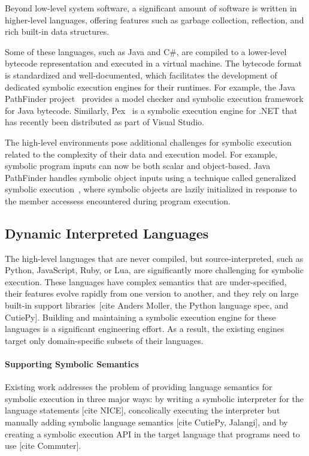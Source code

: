 Beyond low-level system software, a significant amount of software is written in higher-level languages, offering features such as garbage collection, reflection, and rich built-in data structures.

Some of these languages, such as Java and C\#, are compiled to a lower-level bytecode representation and executed in a virtual machine.
%
The bytecode format is standardized and well-documented, which facilitates the development of dedicated symbolic execution engines for their runtimes.
%
For example, the Java PathFinder project~\cite{visser-jpf,jpf-symbex,jpf-testgen} provides a model checker and symbolic execution framework for Java bytecode.
%
Similarly, Pex~\cite{tillmann-pex} is a symbolic execution engine for .NET that has recently been distributed as part of Visual Studio.

The high-level environments pose additional challenges for symbolic execution related to the complexity of their data and execution model.  For example, symbolic program inputs can now be both scalar and object-based.
%
Java PathFinder handles symbolic object inputs using a technique called generalized symbolic execution~\cite{generalized-symbex}, where symbolic objects are lazily initialized in response to the member accessess encountered during program execution.

\subsection{Dynamic Interpreted Languages}

The high-level languages that are never compiled, but source-interpreted, such as Python, JavaScript, Ruby, or Lua, are significantly more challenging for symbolic execution.
%
These languages have complex semantics that are under-specified, their features evolve rapidly from one version to another, and they rely on large built-in support libraries~[cite Anders Moller, the Python language spec, and CutiePy].
%
Building and maintaining a symbolic execution engine for these languages is a significant engineering effort.  As a result, the existing engines target only domain-specific subsets of their languages.

\paragraph{Supporting Symbolic Semantics}

Existing work addresses the problem of providing language semantics for symbolic execution in three major ways: by writing a symbolic interpreter for the language statements [cite NICE], concolically executing the interpreter but manually adding symbolic language semantics [cite CutiePy, Jalangi], and by creating a symbolic execution API in the target language that programs need to use [cite Commuter].

